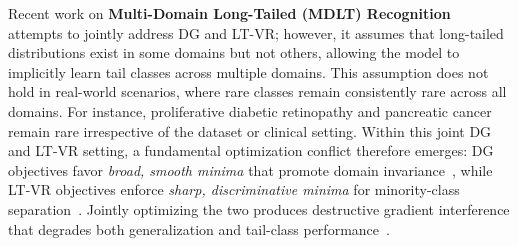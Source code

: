 \documentclass{article}
\begin{document}
\begin{table}
\centering
\vspace{-0.1in}
\scriptsize
\setlength{\tabcolsep}{2pt}
\renewcommand{\arraystretch}{0.9}
\caption{%
  Comparison of
  ERM-ViT~\citep{dosovitskiy2021},
  SPSD-ViT~\citep{Su24a},
  and Ours on Per-class F1 (\%).
  Trained on APTOS; tested in-domain
  ($n{=}733$) and cross-domain on
  Messidor ($n{=}1744$).
  \textbf{G4 PDR} = clinically
  critical rare class.
}
\label{tab:perclass_f1}
\vspace{-0.15in}
\end{table}


Recent work on \textbf{Multi-Domain Long-Tailed (MDLT) Recognition}~\cite{Yang22} attempts to jointly address DG and LT-VR; however, it assumes that long-tailed distributions exist in some domains but not others, allowing the model to implicitly learn tail classes across multiple domains. This assumption does not hold in real-world scenarios, where rare classes remain consistently rare across all domains. For instance, proliferative diabetic retinopathy and pancreatic cancer remain rare irrespective of the dataset or clinical setting. Within this joint DG and LT-VR setting, a fundamental optimization
conflict therefore emerges: DG objectives favor \emph{broad, smooth minima}
that promote domain invariance~\cite{Su24, Su24a}, while LT-VR objectives
enforce \emph{sharp, discriminative minima} for minority-class
separation~\cite{TSCNet25}. Jointly optimizing the two produces destructive
gradient interference that degrades both generalization and tail-class
performance~\cite{Yang22, Zhang21, Su24a}.
\end{document}
